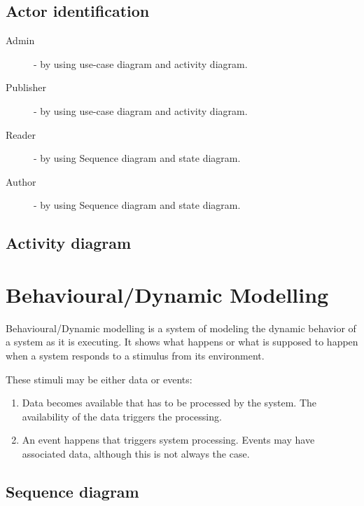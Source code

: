 	\subsection{Actor identification}

	\begin{description}
		\item[Admin] - by using use-case diagram and activity diagram.
		\item[Publisher] - by using use-case diagram and activity diagram.
		\item[Reader] - by using Sequence diagram and state diagram.
		\item[Author] - by using Sequence diagram and state diagram.
	\end{description}

	

	

	\subsection{Activity diagram}

	


\section{Behavioural/Dynamic Modelling}

Behavioural/Dynamic modelling is a system of modeling the dynamic behavior of a system as it is executing. It shows what happens or what is supposed to happen when a system responds to a stimulus from its environment.

These stimuli may be either data or events:
	\begin{enumerate}
		\item Data becomes available that has to be processed by the system. The availability of the data triggers the processing.
		\item An event happens that triggers system processing. Events may have associated data, although this is not always the case.
	\end{enumerate}

	\subsection{Sequence diagram}

	

